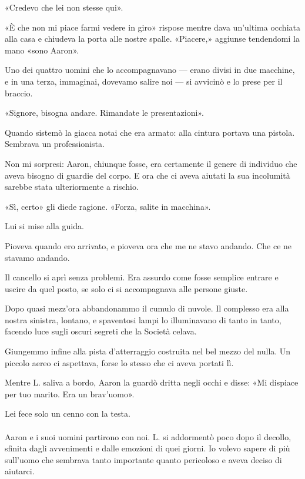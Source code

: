 \documentclass[a4paper,12pt]{book}
\begin{document}
«Credevo che lei non stesse qui».

«È che non mi piace farmi vedere in giro» rispose mentre dava un'ultima occhiata
alla casa e chiudeva la porta alle nostre spalle. «Piacere,» aggiunse tendendomi
la mano «sono Aaron».

Uno dei quattro uomini che lo accompagnavano --- erano divisi in due macchine,
e in una terza, immaginai, dovevamo salire noi --- si avvicinò e lo prese per
il braccio.

«Signore, bisogna andare. Rimandate le presentazioni».

Quando sistemò la giacca notai che era armato: alla cintura portava una pistola.
Sembrava un professionista.

Non mi sorpresi: Aaron, chiunque fosse, era certamente il genere di individuo
che aveva bisogno di guardie del corpo. E ora che ci aveva aiutati la sua
incolumità sarebbe stata ulteriormente a rischio.

«Sì, certo» gli diede ragione. «Forza, salite in macchina».

Lui si mise alla guida.

Pioveva quando ero arrivato, e pioveva ora che me ne stavo andando. Che ce ne
stavamo andando.

Il cancello si aprì senza problemi. Era assurdo come fosse semplice entrare e
uscire da quel posto, se solo ci si accompagnava alle persone giuste.

Dopo quasi mezz'ora abbandonammo il cumulo di nuvole. Il complesso era alla
nostra sinistra, lontano, e spaventosi lampi lo illuminavano di tanto in tanto,
facendo luce sugli oscuri segreti che la Società celava.

Giungemmo infine alla pista d'atterraggio costruita nel bel mezzo del nulla.
Un piccolo aereo ci aspettava, forse lo stesso che ci aveva portati lì.

Mentre L. saliva a bordo, Aaron la guardò dritta negli occhi e disse: «Mi
dispiace per tuo marito. Era un brav'uomo».

Lei fece solo un cenno con la testa.

\paragraph{}
Aaron e i suoi uomini partirono con noi. L. si addormentò poco dopo il decollo,
sfinita dagli avvenimenti e dalle emozioni di quei giorni. Io volevo sapere di
più sull'uomo che sembrava tanto importante quanto pericoloso e aveva deciso di
aiutarci.
\end{document}

